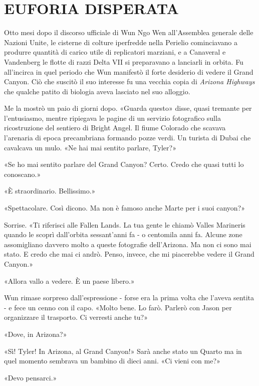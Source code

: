 \chapter{EUFORIA DISPERATA}\label{euforia-disperata}

\hfill\break

Otto mesi dopo il discorso ufficiale di Wun Ngo Wen all'Assemblea
generale delle Nazioni Unite, le cisterne di colture iperfredde nella
Perielio cominciavano a produrre quantità di carico utile di replicatori
marziani, e a Canaveral e Vandenberg le flotte di razzi Delta VII si
preparavano a lanciarli in orbita. Fu all'incirca in quel periodo che
Wun manifestò il forte desiderio di vedere il Grand Canyon. Ciò che
suscitò il suo interesse fu una vecchia copia di \emph{Arizona Highways}
che qualche patito di biologia aveva lasciato nel suo alloggio.

Me la mostrò un paio di giorni dopo. «Guarda questo» disse, quasi
tremante per l'entusiasmo, mentre ripiegava le pagine di un servizio
fotografico sulla ricostruzione del sentiero di Bright Angel. Il fiume
Colorado che scavava l'arenaria di epoca precambriana formando pozze
verdi. Un turista di Dubai che cavalcava un mulo. «Ne hai mai sentito
parlare, Tyler?»

«Se ho mai sentito parlare del Grand Canyon? Certo. Credo che quasi
tutti lo conoscano.»

«È straordinario. Bellissimo.»

«Spettacolare. Così dicono. Ma non è famoso anche Marte per i suoi
canyon?»

Sorrise. «Ti riferisci alle Fallen Lands. La tua gente le chiamò Valles
Marineris quando le scoprì dall'orbita sessant'anni fa - o centomila
anni fa. Alcune zone assomigliano davvero molto a queste fotografie
dell'Arizona. Ma non ci sono mai stato. E credo che mai ci andrò. Penso,
invece, che mi piacerebbe vedere il Grand Canyon.»

«Allora vallo a vedere. È un paese libero.»

Wun rimase sorpreso dall'espressione - forse era la prima volta che
l'aveva sentita - e fece un cenno con il capo. «Molto bene. Lo farò.
Parlerò con Jason per organizzare il trasporto. Ci verresti anche tu?»

«Dove, in Arizona?»

«Sì! Tyler! In Arizona, al Grand Canyon!» Sarà anche stato un Quarto ma
in quel momento sembrava un bambino di dieci anni. «Ci vieni con me?»

«Devo pensarci.»

